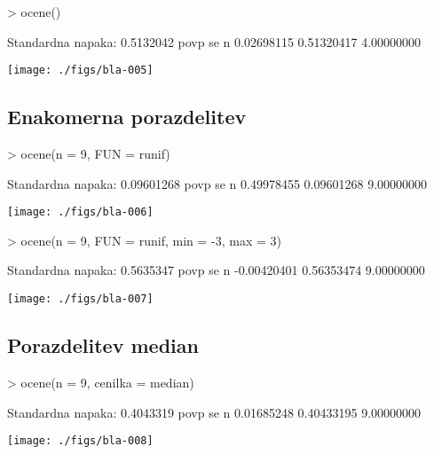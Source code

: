 \documentclass[a4paper,12pt]{article}
\begin{document}
\begin{Schunk}
\begin{Sinput}
> ocene()
\end{Sinput}
\begin{Soutput}
Standardna napaka: 
 0.5132042 
      povp         se          n 
0.02698115 0.51320417 4.00000000 
\end{Soutput}
\end{Schunk}
\texttt{[image: ./figs/bla-005]}
\clearpage
\subsection{Enakomerna porazdelitev}
\begin{Schunk}
\begin{Sinput}
> ocene(n = 9, FUN = runif)
\end{Sinput}
\begin{Soutput}
Standardna napaka: 
 0.09601268 
      povp         se          n 
0.49978455 0.09601268 9.00000000 
\end{Soutput}
\end{Schunk}
\texttt{[image: ./figs/bla-006]}
\clearpage
\begin{Schunk}
\begin{Sinput}
> ocene(n = 9, FUN = runif, min = -3, max = 3)
\end{Sinput}
\begin{Soutput}
Standardna napaka: 
 0.5635347 
       povp          se           n 
-0.00420401  0.56353474  9.00000000 
\end{Soutput}
\end{Schunk}
\texttt{[image: ./figs/bla-007]}
\clearpage
\subsection{Porazdelitev median}
\begin{Schunk}
\begin{Sinput}
> ocene(n = 9, cenilka = median)
\end{Sinput}
\begin{Soutput}
Standardna napaka: 
 0.4043319 
      povp         se          n 
0.01685248 0.40433195 9.00000000 
\end{Soutput}
\end{Schunk}
\texttt{[image: ./figs/bla-008]}
\clearpage
\end{document}

